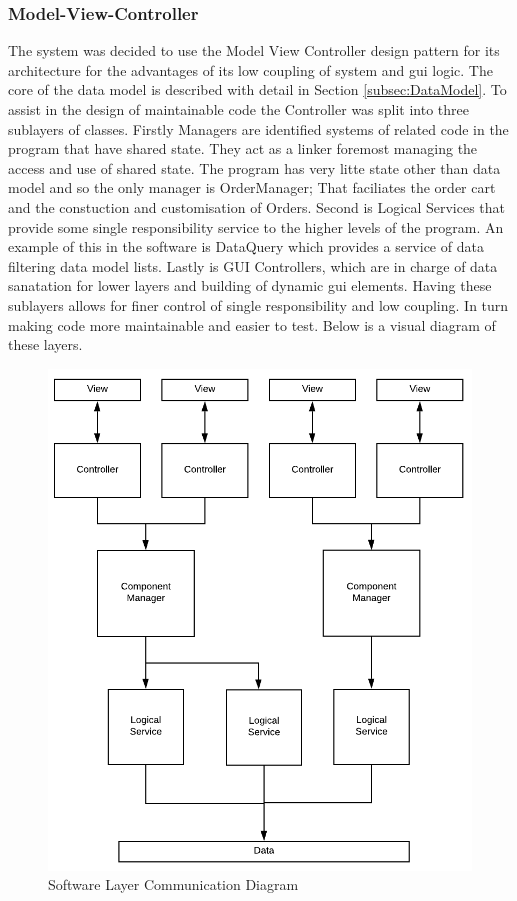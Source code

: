 	\subsubsection{Model-View-Controller}
		The system was decided to use the Model View Controller design pattern for its architecture for the advantages of its low coupling of system and gui logic. The core of the data model is described with detail in Section \ref{subsec:DataModel}. To assist in the design of maintainable code the Controller was split into three sublayers of classes. Firstly Managers are identified systems of related code in the program that have shared state. They act as a linker foremost managing the access and use of shared state. The program has very litte state other than data model and so the only manager is OrderManager; That faciliates the order cart and the constuction and customisation of Orders.
		 Second is Logical Services that provide some single responsibility service to the higher levels of the program. An example of this in the software is DataQuery which provides a service of data filtering data model lists. 
		Lastly is GUI Controllers, which are in charge of data sanatation for lower layers and building of dynamic gui elements.
		Having these sublayers allows for finer control of single responsibility and low coupling. In turn making code more maintainable and easier to test. Below is a visual diagram of these layers.

		\begin{figure}[h]
			\centering
			\includegraphics[width=.6\linewidth]{images/data_model/architecture.png}
			\caption{Software Layer Communication Diagram}
		\end{figure}


